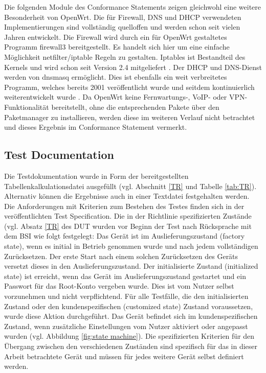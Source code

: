 \documentclass[a4paper]{book}
\begin{document}
\begin{large}
\begin{onehalfspace}
 	 Die folgenden Module des \glqq Conformance Statements\grqq{} zeigen gleichwohl eine weitere Besonderheit von OpenWrt. Die für Firewall, DNS und DHCP verwendeten Implementierungen sind vollständig quelloffen und  werden schon seit vielen Jahren entwickelt. Die Firewall wird durch ein für OpenWrt gestaltetes Programm firewall3 bereitgestellt. Es handelt sich hier um eine einfache Möglichkeit netfilter/iptable Regeln zu gestalten. Iptables ist Bestandteil des Kernels und wird schon seit Version 2.4 mitgeliefert \cite{PaulRussell.}. Der DHCP und DNS-Dienst werden von dnsmasq ermöglicht. Dies ist ebenfalls ein weit verbreitetes Programm, welches bereits 2001 veröffentlicht wurde und seitdem kontinuierlich weiterentwickelt wurde \cite{SimonKelley.2001}. Da OpenWrt keine Fernwartungs-, VoIP- oder VPN-Funktionalität bereitstellt, ohne die entsprechenden Pakete über den Paketmanager zu installieren, werden diese im weiteren Verlauf nicht betrachtet und dieses Ergebnis im \glqq Conformance Statement\grqq{} vermerkt.


\end{onehalfspace}

\subsection{Test Documentation}
\label{Test Doku}
\begin{onehalfspace}
Die Testdokumentation wurde in Form der bereitgestellten Tabellenkalkulationsdatei ausgefüllt (vgl. Abschnitt \ref{TR} und Tabelle \ref{tab:TR}). Alternativ können die Ergebnisse auch in einer Textdatei festgehalten werden. Die Anforderungen mit Kriterien zum Bestehen des Testes finden sich in der veröffentlichten \glqq Test Specification\grqq{}. Die in der Richtlinie spezifizierten Zustände (vgl. Absatz \ref{TR} des DUT wurden vor Beginn der Test nach Rücksprache mit dem BSI wie folgt festgelegt: Das Gerät ist im Auslieferungszustand (factory state), wenn es initial in Betrieb genommen wurde und nach jedem vollständigen Zurücksetzen. Der erste Start nach einem solchen Zurücksetzen des Geräts versetzt dieses in den Auslieferungszustand. Der initialisierte Zustand (initialized state) ist erreicht, wenn das Gerät im Auslieferungszustand gestartet und ein Passwort für das Root-Konto vergeben wurde. Dies ist vom Nutzer selbst vorzunehmen und nicht verpflichtend. Für alle Testfälle, die den initialisierten Zustand oder den kundenspezifischen (customized state) Zustand voraussetzen, wurde diese Aktion durchgeführt. Das Gerät befindet sich im kundenspezifischen Zustand, wenn zusätzliche Einstellungen vom Nutzer aktiviert oder angepasst wurden (vgl. Abbildung \ref{fig:state machine}). Die spezifizierten Kriterien für den Übergang zwischen den verschiedenen Zuständen sind \mbox spezifisch für das in dieser Arbeit betrachtete Gerät und müssen für jedes weitere Gerät selbst definiert werden. 	


\end{onehalfspace}
\end{large}
\end{document}

